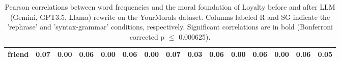 \begin{table}[ht!]
{\begin{tabular}{rrr|rrrrrr|rrrrrr}
  friend & \bf{0.07} & \bf{0.00} & \bf{0.06} & \bf{0.00} & 0.06 & 0.00 & 0.07 & 0.03 & \bf{0.06} & \bf{0.00} & 0.06 & 0.00 & 0.06 & 0.05 \\ 
   \hline
\end{tabular}}
\caption{Pearson correlations between word frequencies and the moral foundation of Loyalty before and after LLM (Gemini, GPT3.5, Llama) rewrite on the YourMorals dataset. Columns labeled R and SG indicate the ’rephrase’ and ’syntax-grammar’ conditions, respectively. Significant correlations are in bold (Bonferroni corrected p $\leq$ 0.000625).} 
\end{table}